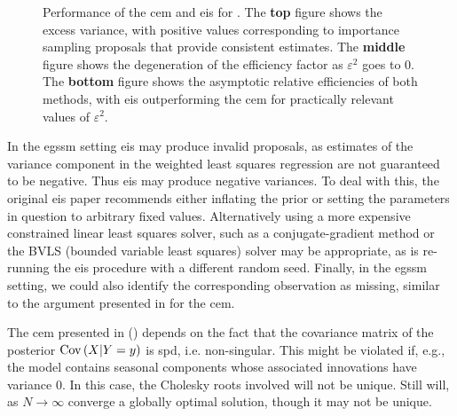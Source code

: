 \begin{example}
\begin{figure}
        \resizebox{\textwidth}{!}{%
        }
        \caption{Performance of the \acrshort{cem} and \acrshort{eis} for . The \textbf{top} figure shows the excess variance, with positive values corresponding to importance sampling proposals that provide consistent estimates. The \textbf{middle} figure shows the degeneration of the efficiency factor as $\varepsilon^{2}$ goes to $0$. The \textbf{bottom} figure shows the asymptotic relative efficiencies of both methods, with \acrshort{eis} outperforming the \acrshort{cem} for practically relevant values of $\varepsilon^{2}$.}
        \label{fig:gsmm_eps}
    \end{figure}

\end{example}
\vspace{15pt}
In the \gls{egssm} setting \gls{eis} may produce invalid proposals, as estimates of the variance component in the weighted least squares regression are not guaranteed to be negative. Thus \gls{eis} may produce negative variances. To deal with this, the original \gls{eis} paper \citep[Section 3.2]{Richard2007Efficient} recommends either inflating the prior or setting the parameters in question to arbitrary fixed values. Alternatively using a more expensive constrained linear least squares solver, such as a conjugate-gradient method \citep{Branch1999Subspace} or the BVLS (bounded variable least squares) solver \citep{Stark1995Boundedvariable} may be appropriate, as is re-running the \gls{eis} procedure with a different random seed. Finally, in the \gls{egssm} setting, we could also identify the corresponding observation as missing, similar to the argument presented in  for the \gls{cem}. 

The \gls{cem} presented in  () depends on the fact that the covariance matrix of the posterior $\operatorname{Cov} \left( X | Y = y \right)$ is \gls{spd}, i.e. non-singular. This might be violated if, e.g., the model contains seasonal components whose associated innovations have variance $0$. In this case, the Cholesky roots involved will not be unique. Still  will, as $N\to\infty$ converge a globally optimal solution, though it may not be unique. 


